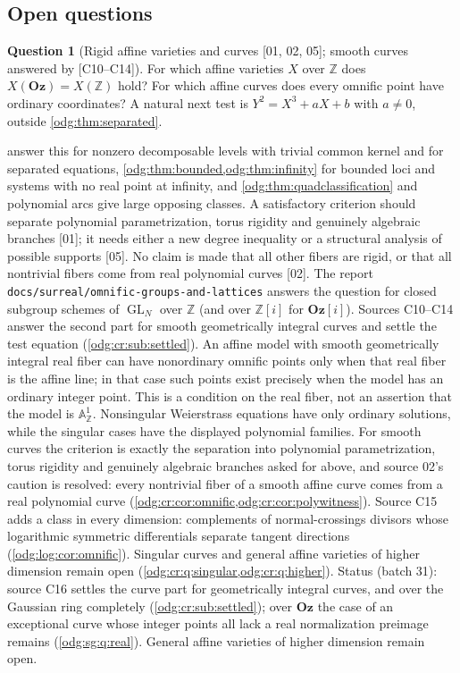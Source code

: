 \documentclass[11pt,oneside]{article}
\numberwithin{equation}{section}
\theoremstyle{definition}
\newtheorem{question}[question]{Question}
\theoremstyle{remark}
\newcommand{\Oz}{\mathbf{Oz}}
\newcommand{\Z}{\mathbb Z}
\newcommand{\GL}{\operatorname{GL}}
\newcommand{\src}[1]{\textup{\textsf{\small[#1]}}}
\newcommand{\fn}[1]{\nolinkurl{#1}}
\newcommand{\Og}{\Oz[i]}
\newcommand{\Aff}{\mathbb A}
\begin{document}
\subsection{Open questions}

\begin{question}[Rigid affine varieties and curves \src{01, 02, 05}; smooth curves answered by \src{C10--C14}]\label{odg:q:affine}
For which affine varieties $X$ over $\Z$ does $X(\Oz)=X(\Z)$ hold? For which
affine curves does every omnific point have ordinary coordinates? A natural
next test is $Y^2=X^3+aX+b$ with $a\ne0$, outside
\cref{odg:thm:separated}.
\end{question}
 answer this for
nonzero decomposable levels with trivial common kernel and for separated
equations, \cref{odg:thm:bounded,odg:thm:infinity} for bounded loci and
systems with no real point at infinity, and \cref{odg:thm:quadclassification}
and polynomial arcs give large opposing classes. A satisfactory criterion
should separate polynomial parametrization, torus rigidity and genuinely
algebraic branches \src{01}; it needs either a new degree inequality or a
structural analysis of possible supports \src{05}. No claim is made that all
other fibers are rigid, or that all nontrivial fibers come from real
polynomial curves \src{02}. The report
\fn{docs/surreal/omnific-groups-and-lattices} answers the question for closed
subgroup schemes of $\GL_N$ over $\Z$ (and over $\Z[i]$ for $\Og$). Sources
C10--C14 answer the second part for smooth geometrically integral curves and
settle the test equation (\cref{odg:cr:sub:settled}). An affine model
with smooth geometrically integral real fiber can have nonordinary omnific
points only when that real fiber is the affine line; in that case such
points exist precisely when the model has an ordinary integer point.
This is a condition on the real fiber, not an assertion that the model is
$\Aff^1_\Z$. Nonsingular Weierstrass equations have only ordinary
solutions, while the singular cases have the displayed polynomial families. For smooth curves the criterion is exactly the separation into polynomial
parametrization, torus rigidity and genuinely algebraic branches asked for above,
and source 02's caution is resolved: every nontrivial fiber of a smooth affine curve
comes from a real polynomial curve (\cref{odg:cr:cor:omnific,odg:cr:cor:polywitness}).
Source C15 adds a class in every dimension: complements of normal-crossings divisors
whose logarithmic symmetric differentials separate tangent directions
(\cref{odg:log:cor:omnific}). Singular curves and general affine varieties of higher
dimension remain open (\cref{odg:cr:q:singular,odg:cr:q:higher}). Status (batch 31):
source C16 settles the curve part for geometrically integral curves, and over the Gaussian
ring completely (\cref{odg:cr:sub:settled}); over $\Oz$ the case of an exceptional curve
whose integer points all lack a real normalization preimage remains (\cref{odg:sg:q:real}).
General affine varieties of higher dimension remain open.
\end{document}
